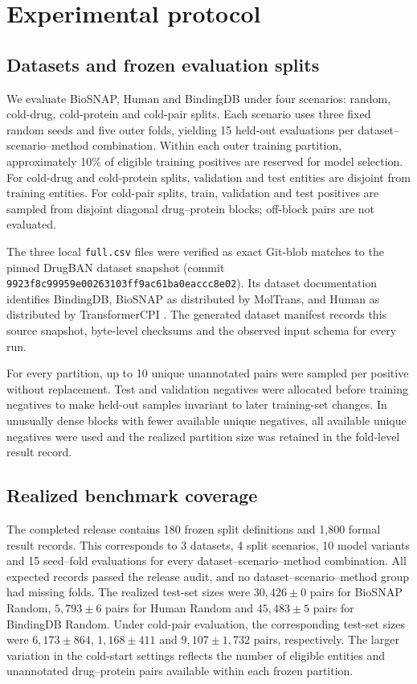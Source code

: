 \section{Experimental protocol}

\subsection{Datasets and frozen evaluation splits}
We evaluate BioSNAP, Human and BindingDB under four scenarios: random,
cold-drug, cold-protein and cold-pair splits. Each scenario uses three fixed
random seeds and five outer folds, yielding 15 held-out evaluations per
dataset--scenario--method combination. Within each outer training partition,
approximately 10\% of eligible training positives are reserved for model
selection. For cold-drug and cold-protein splits, validation and test entities
are disjoint from training entities. For cold-pair splits, train, validation
and test positives are sampled from disjoint diagonal drug--protein blocks;
off-block pairs are not evaluated.

The three local \texttt{full.csv} files were verified as exact Git-blob matches
to the pinned DrugBAN dataset snapshot (commit
\texttt{9923f8c99959e00263103ff9ac61ba0eaccc8e02}). Its dataset documentation
identifies BindingDB, BioSNAP as distributed by MolTrans, and Human as
distributed by TransformerCPI \cite{bai2023drugban,liu2007bindingdb,huang2021moltrans,chen2020transformercpi}.
The generated dataset manifest records this source snapshot, byte-level
checksums and the observed input schema for every run.

For every partition, up to 10 unique unannotated pairs were sampled per
positive without replacement. Test and validation negatives were allocated
before training negatives to make held-out samples invariant to later
training-set changes. In unusually dense blocks with fewer available unique
negatives, all available unique negatives were used and the realized partition
size was retained in the fold-level result record.

\subsection{Realized benchmark coverage}
The completed release contains 180 frozen split definitions and 1,800
formal result records. This corresponds to 3 datasets, 4 split scenarios,
10 model variants and 15 seed--fold evaluations for every
dataset--scenario--method combination. All expected records passed the
release audit, and no dataset--scenario--method group had missing folds.
The realized test-set sizes were $30,426 \pm 0$ pairs for BioSNAP Random,
$5,793 \pm 6$ pairs for Human Random and $45,483 \pm 5$ pairs for
BindingDB Random. Under cold-pair evaluation, the corresponding test-set
sizes were $6,173 \pm 864$, $1,168 \pm 411$ and $9,107 \pm 1,732$ pairs,
respectively. The larger variation in the cold-start settings reflects the
number of eligible entities and unannotated drug--protein pairs available
within each frozen partition.

